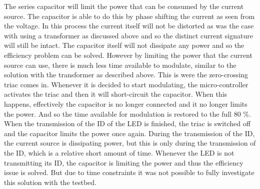 	The series capacitor will limit the power that can be consumed by the current source.
	The capacitor is able to do this by phase shifting the current as seen from the voltage.
	In this process the current itself will not be distorted as was the case with using a transformer as discussed above and so the distinct current signature will still be intact.
	The capacitor itself will not dissipate any power and so the efficiency problem can be solved.
	However by limiting the power that the current source can use, there is much less time available to modulate, similar to the solution with the transformer as described above.
	This is were the zero-crossing triac comes in.
	Whenever it is decided to start modulating, the micro-controller activates the triac and then it will short-circuit the capacitor.
	When this happens, effectively the capacitor is no longer connected and it no longer limits the power.
	And so the time available for modulation is restored to the full 80 \%.
	When the transmission of the ID of the LED is finished, the triac is switched off and the capacitor limits the power once again.
	During the transmission of the ID, the current source is dissipating power, but this is only during the transmission of the ID, which is a relative short amount of time.
	Whenever the LED is not transmitting its ID, the capacitor is limiting the power and thus the efficiency issue is solved.
	But due to time constraints it was not possible to fully investigate this solution with the testbed.	


